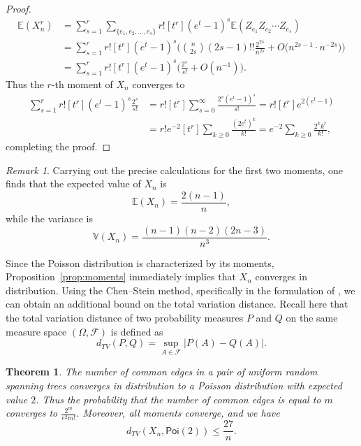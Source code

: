 \documentclass[a4paper,12pt,reqno]{amsart}
\newtheorem{theorem}[lemma]{Theorem}
\theoremstyle{remark}
\newtheorem{remark}{Remark}
\newcommand{\Ex}{\mathbb{E}}
\newcommand{\Va}{\mathbb{V}}
\newcommand{\Poi}{\mathsf{Poi}}
\begin{document}
\begin{proof}
\begin{align*}
\Ex(X_n^r) &= \sum_{s=1}^r \sum_{\{e_1,e_2,\ldots,e_s\}} r! [t^r] (e^t-1)^s \Ex(Z_{e_1}Z_{e_2}\cdots Z_{e_s}) \\
&= \sum_{s=1}^r r! [t^r] (e^t-1)^s \Big( \binom{n}{2s} (2s-1)!! \frac{2^{2s}}{n^{2s}} + O \Big( n^{2s-1} \cdot n^{-2s} \Big) \Big) \\
&= \sum_{s=1}^r r! [t^r] (e^t-1)^s \Big( \frac{2^s}{s!} + O(n^{-1}) \Big).
\end{align*}
Thus the $r$-th moment of $X_n$ converges to
\begin{align*}
\sum_{s=1}^r r! [t^r] (e^t-1)^s \frac{2^s}{s!} &= r! [t^r] \sum_{s = 0}^{\infty} \frac{2^s (e^t-1)^s}{s!} = r! [t^r] e^{2(e^t-1)} \\
&= r! e^{-2} [t^r] \sum_{k \geq 0} \frac{(2e^t)^k}{k!} = e^{-2} \sum_{k \geq 0} \frac{2^k k^r}{k!},
\end{align*}
completing the proof.
\end{proof}

\begin{remark}
Carrying out the precise calculations for the first two moments, one finds that the expected value of $X_n$ is
\[\Ex(X_n) = \frac{2(n-1)}{n},\]
while the variance is
\[\Va(X_n) = \frac{(n-1)(n-2)(2n-3)}{n^3}.\]
\end{remark}

Since the Poisson distribution is characterized by its moments, Proposition~\ref{prop:moments} immediately implies that $X_n$ converges in distribution. Using the Chen--Stein method, specifically in the formulation of \cite{AGG89}, we can obtain an additional bound on the total variation distance. Recall here that the total variation distance of two probability measures $P$ and $Q$ on the same measure space $(\Omega,\mathcal{F})$ is defined as
    \[d_{TV}(P,Q) = \sup_{A \in \mathcal{F}} |P(A) - Q(A)|.\]   

\begin{theorem}\label{thm:labelled1}
The number of common edges in a pair of uniform random spanning trees converges in distribution to a Poisson distribution with expected value $2$. Thus the probability that the number of common edges is equal to $m$ converges to $\frac{2^m}{e^2 m!}$. Moreover, all moments converge, and we have
    \[
        d_{TV}(X_n,\Poi(2)) \leq \frac{27}{n}.
    \]
\end{theorem}
\end{document}

